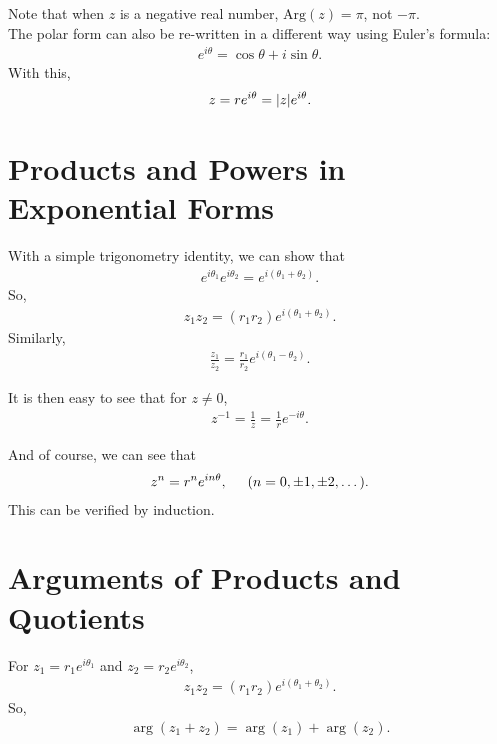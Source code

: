 \documentclass{book}
\theoremstyle{definition}
\newcommand{\Arg}{\text{Arg}}
\newcommand{\f}[2]{\frac{#1}{#2}}
\begin{document}
Note that when $z$ is a negative real number, $\Arg(z) = \pi$, not $-\pi$.\\

The polar form can also be re-written in a different way using Euler's formula:
\begin{align}
e^{i\theta} = \cos\theta + i\sin\theta.
\end{align}
With this,
\begin{align}
z = re^{i\theta} = \abs{z}e^{i\theta}.
\end{align}


\section{Products and Powers in Exponential Forms}

With a simple trigonometry identity, we can show that 
\begin{align}
e^{i\theta_1}e^{i\theta_2} = e^{i(\theta_1 + \theta_2)}.
\end{align}
So,
\begin{align}
z_1 z_2 = (r_1r_2)e^{i(\theta_1 + \theta_2)}.
\end{align}
Similarly,
\begin{align}
\f{z_1}{z_2} = \f{r_1}{r_2}e^{i(\theta_1 - \theta_2)}.
\end{align}

It is then easy to see that for $z\neq 0$,
\begin{align}
z^{-1} = \f{1}{z} = \f{1}{r}e^{-i\theta}.
\end{align}

And of course, we can see that 
\begin{align}
z^n = r^n e^{in\theta}, \hspace{0.5cm} (n=0,\pm 1,\pm 2,\dots).
\end{align}
This can be verified by induction. 


\section{Arguments of Products and Quotients}

For $z_1 = r_1 e^{i\theta_1}$ and $z_2 = r_2 e^{i\theta_2}$, 
\begin{align}
z_1z_2 = (r_1r_2)e^{i(\theta_1 + \theta_2)}.
\end{align}
So,
\begin{align}
\arg(z_1 + z_2) = \arg(z_1) + \arg(z_2).
\end{align}
\end{document}
